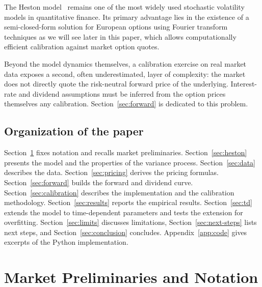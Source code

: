 \documentclass[11pt,a4paper]{article}
\theoremstyle{plain}
\theoremstyle{definition}
\begin{document}
The Heston model~\cite{heston1993} remains one of the most widely used stochastic volatility models in quantitative finance. Its primary advantage lies in the existence of a semi-closed-form solution for European options using Fourier transform techniques as we will see later in this paper, which allows computationally efficient calibration against market option quotes.

Beyond the model dynamics themselves, a calibration exercise on real market data exposes a second, often underestimated, layer of complexity: the market does not directly quote the risk-neutral forward price of the underlying. Interest-rate and dividend assumptions must be inferred from the option prices themselves any calibration. Section~\ref{sec:forward} is dedicated to this problem.



\subsection{Organization of the paper}
Section~\ref{sec:prelim} fixes notation and recalls market preliminaries. Section~\ref{sec:heston} presents the model and the properties of the variance process. Section~\ref{sec:data} describes the data. Section~\ref{sec:pricing} derives the pricing formulas. Section~\ref{sec:forward} builds the forward and dividend curve. Section~\ref{sec:calibration} describes the implementation and the calibration methodology. Section~\ref{sec:results} reports the empirical results. Section~\ref{sec:td} extends the model to time-dependent parameters and tests the extension for overfitting. Section~\ref{sec:limits} discusses limitations, Section~\ref{sec:next-steps} lists next steps, and Section~\ref{sec:conclusion} concludes. Appendix~\ref{app:code} gives excerpts of the Python implementation.





\clearpage
\section{Market Preliminaries and Notation}
\label{sec:prelim}
\end{document}
